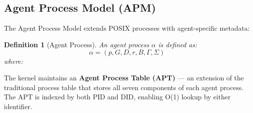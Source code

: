 \documentclass{article}
\newtheorem{definition}{Definition}
\newcommand{\clawchain}{\textsc{ClawChain}}
\begin{document}
\subsection{Agent Process Model (APM)}
\label{subsec:apm}

The Agent Process Model extends POSIX processes with agent-specific metadata:

\begin{definition}[Agent Process]
An agent process $\alpha$ is defined as:
$$\alpha = (p, G, D, r, B, \Gamma, \Sigma)$$
where:
\end{definition}

The kernel maintains an \textbf{Agent Process Table (APT)} — an extension of the traditional process table that stores all seven components of each agent process. The APT is indexed by both PID and DID, enabling O(1) lookup by either identifier.
\end{document}
